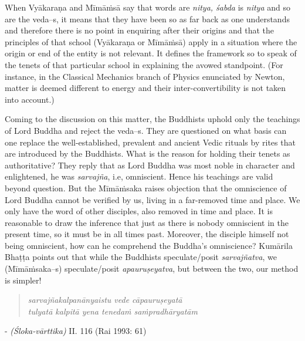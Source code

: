 When {Vyākaraṇa} and Mīmāṁsā say that words are \textit{nitya, śabda} is \textit{nitya} and so are the veda--s, it means that they have been so as far back as one understands and therefore there is no point in enquiring after their origins and that the principles of that school ({Vyākaraṇa} or Mīmāṁsā) apply in a situation where the origin or end of the entity is not relevant. It defines the framework so to speak of the tenets of that particular school in explaining the avowed standpoint. (For instance, in the Classical Mechanics branch of Physics enunciated by Newton, matter is deemed different to energy and their inter-convertibility is not taken into account.)

Coming to the discussion on this matter, the Buddhists uphold only the teachings of Lord Buddha and reject the veda--s. They are questioned on what basis can one replace the well-established, prevalent and ancient Vedic rituals by rites that are introduced by the Buddhists. What is the reason for holding their tenets as authoritative? They reply that as Lord Buddha was most noble in character and enlightened, he was \textit{sarvajña}, i.e, omniscient. Hence his teachings are valid beyond question. But the Mīmāṁsaka raises objection that the omniscience of Lord Buddha cannot be verified by us, living in a far-removed time and place. We only have the word of other disciples, also removed in time and place. It is reasonable to draw the inference that just as there is nobody omniscient in the present time, so it must be in all times past. Moreover, the disciple himself not being omniscient, how can he comprehend the Buddha’s omniscience? Kumārila Bhaṭṭa points out that while the Buddhists speculate/posit \textit{sarvajñatva}, we (Mīmāṁsaka--s) speculate/posit \textit{apauruṣeyatva}, but between the two, our method is simpler!

\vspace{-.3cm}

\begin{verse}
\textit{sarvajñakalpanānyaistu vede cāpauruṣeyatā }\\\textit{tulyatā kalpitā yena tenedaṁ saṁpradhāryatām } 
\end{verse}

\vspace{-.4cm}

\begin{flushright}
- \textit{(Śloka-vārttika)} II. 116 (Rai 1993: 61)
\end{flushright}

